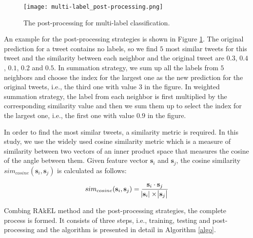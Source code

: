 \documentclass[letterpaper]{article}
\begin{document}
\begin{figure}[th]
\centering
\texttt{[image: multi-label\_post-processing.png]}
\caption{The post-processing for multi-label classification.}
\label{fig:multi_post_processing}
\end{figure}

An example for the post-processing strategies is shown in Figure \ref{fig:multi_post_processing}. The original prediction for a tweet contains no labels, so we find $5$ most similar tweets for this tweet and the similarity between each neighbor and the original tweet are $0.3$, $0.4$, $0.1$, $0.2$ and $0.5$. In summation strategy, we sum up all the labels from $5$ neighbors and choose the index for the largest one as the new prediction for the original tweets, i.e., the third one with value $3$ in the figure. In weighted summation strategy, the label from each neighbor is first multiplied by the corresponding similarity value and then we sum them up to select the index for the largest one, i.e., the first one with value $0.9$ in the figure.

In order to find the most similar tweets, a similarity metric is required. In this study, we use the widely used cosine similarity metric which is a measure of similarity between two vectors of an inner product space that measures the cosine of the angle between them. Given feature vector $\mathbf{s}_i$ and $\mathbf{s}_j$, the cosine similarity $sim_{cosine}(\mathbf{s}_i, \mathbf{s}_j)$ is calculated as follows:

\begin{equation}
    sim_{cosine}(\mathbf{s}_i, \mathbf{s}_j) = \frac{\mathbf{s}_i \cdot \mathbf{s}_j}{\abs{\mathbf{s}_i} \times \abs{\mathbf{s}_j}}
\end{equation}

Combing RAkEL method and the post-processing strategies, the complete process is formed. It consists of three steps, i.e., training, testing and post-processing and the algorithm is presented in detail in Algorithm \ref{algo}.
\end{document}
